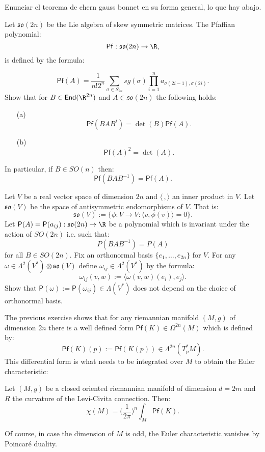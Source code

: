 Enunciar el teorema de chern gauss bonnet en su forma general, lo que hay abajo.

\begin{exercise} Let $ \mathfrak{so}(2n) $ be the Lie algebra of skew symmetric matrices.
	The Pfaffian polynomial: \[\mathsf{Pf}: \mathfrak{so}(2n) \rightarrow \R,\] is defined by the formula:
	
	\[ \mathsf{Pf}(A)= \frac{1}{n!2^n }\sum_{\sigma \in S_{2n}} sg(\sigma) \prod_{i=1}^n a_{\sigma(2i-1),\sigma(2i)}.\]
	Show that for $B \in \mathsf{End}(\R^{2n})$ and $ A \in \mathfrak{so}(2n)$ the following holds:
	\begin{itemize}
		\item[(a)] \[ \mathsf{Pf}(B A B^t)= \det(B) \mathsf{Pf}(A).\]
		\item[(b)] \[ \mathsf{Pf}(A)^2= \det(A).\]
	\end{itemize}
	In particular, if $B \in SO(n)$ then:
	\[ \mathsf{Pf}(B A B^{-1})= \mathsf{Pf}(A).\]
\end{exercise}


\begin{exercise}
	Let $V$ be a real vector space of dimension $2n$ and $ \langle \,, \rangle$ an inner product in $V$. Let $\mathfrak{so}(V)$ be the space of antisymmetric endomorphisms of $V$. That is:
	\[ \mathfrak{so}(V):=\{ \phi: V \rightarrow V: \langle v , \phi(v)\rangle=0\}.\]
	Let $\mathsf{P}(A)=\mathsf{P}(a_{ij}): \mathfrak{so}(2n) \rightarrow \R$ be a polynomial which is invariant under the action of $SO(2n)$ i.e. such that:
	\[ P(BAB^{-1})=P(A)\]
	for all $B \in SO(2n)$. Fix an orthonormal basis $\{ e_1, \dots, e_{2n}\}$ for $V$. For any $\omega \in \Lambda^2 (V^*) \otimes \mathfrak{so}(V)$ define $\omega_{ij} \in \Lambda^2(V^*)$ by the formula:
	\[ \omega_{ij}(v,w):=\langle \omega(v,w)(e_i), e_j \rangle.\]
	Show that $\mathsf{P}(\omega):= \mathsf{P}(\omega_{ij})\in \Lambda(V^*)$ does not depend on the choice of orthonormal basis.
\end{exercise}


The previous exercise shows that for any riemannian manifold $(M,g)$ of dimension $2n$ there is a well defined form $\mathsf{Pf}(K)\in \Omega^{2n}(M)$ which is defined by:
\[ \mathsf{Pf}(K)(p):= \mathsf{Pf}(K(p))\in \Lambda^{2n}(T^*_pM).\]
This differential form is what needs to be integrated over $M$ to obtain the Euler characteristic:

\begin{theorem}
	Let $(M,g)$ be a closed oriented riemannian manifold of dimension $d=2m$ and $R$ the curvature of the Levi-Civita connection. Then:
	\[ \chi(M)=\Big(\frac{1}{2\pi}\Big)^n \int_M \mathsf{Pf}(K).\]
\end{theorem}

Of course, in case the dimension of $M$ is odd, the Euler characteristic vanishes by Poincar\'e duality.